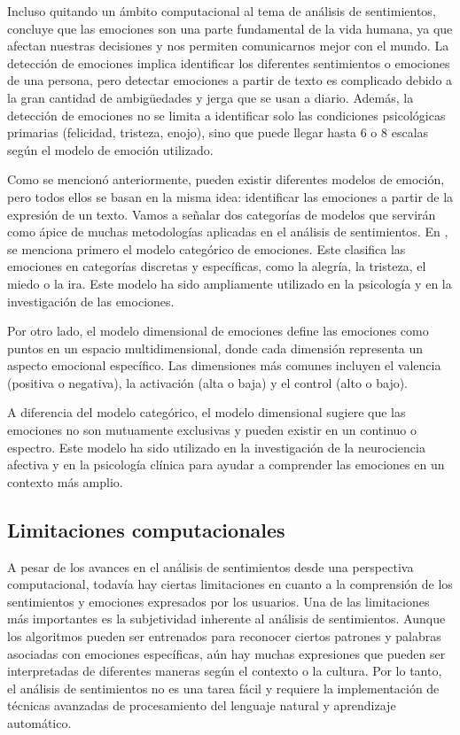 \documentclass[12pt, conference]{IEEEtran}
\begin{document}
Incluso quitando un ámbito computacional al tema de análisis de sentimientos, \cite{b2} concluye que las emociones son una parte fundamental de la vida humana, ya que afectan nuestras decisiones y nos permiten comunicarnos mejor con el mundo. 
La detección de emociones implica identificar los diferentes sentimientos o emociones de una persona, pero detectar emociones a partir de texto es complicado debido a la gran cantidad de ambigüedades y jerga que se usan a diario. 
Además, la detección de emociones no se limita a identificar solo las condiciones psicológicas primarias (felicidad, tristeza, enojo), sino que puede llegar hasta 6 o 8 escalas según el modelo de emoción utilizado.

Como se mencionó anteriormente, pueden existir diferentes modelos de emoción, pero todos ellos se basan en la misma idea: identificar las emociones a partir de la expresión de un texto. Vamos a señalar dos categorías de modelos que servirán como ápice de muchas metodologías aplicadas en el análisis de sentimientos. En \cite{b3}, se menciona primero el modelo categórico de emociones. Este clasifica las emociones en categorías discretas y específicas, como la alegría, la tristeza, el miedo o la ira. Este modelo ha sido ampliamente utilizado en la psicología y en la investigación de las emociones.

Por otro lado, el modelo dimensional de emociones define las emociones como puntos en un espacio multidimensional, donde cada dimensión representa un aspecto emocional específico. Las dimensiones más comunes incluyen el valencia (positiva o negativa), la activación (alta o baja) y el control (alto o bajo).

A diferencia del modelo categórico, el modelo dimensional sugiere que las emociones no son mutuamente exclusivas y pueden existir en un continuo o espectro. Este modelo ha sido utilizado en la investigación de la neurociencia afectiva y en la psicología clínica para ayudar a comprender las emociones en un contexto más amplio.

\subsection{Limitaciones computacionales}
A pesar de los avances en el análisis de sentimientos desde una perspectiva computacional, todavía hay ciertas limitaciones en cuanto a la comprensión de los sentimientos y emociones expresados por los usuarios. 
Una de las limitaciones más importantes es la subjetividad inherente al análisis de sentimientos. 
Aunque los algoritmos pueden ser entrenados para reconocer ciertos patrones y palabras asociadas con emociones específicas, aún hay muchas expresiones que pueden ser interpretadas de diferentes maneras según el contexto o la cultura. 
Por lo tanto, el análisis de sentimientos no es una tarea fácil y requiere la implementación de técnicas avanzadas de procesamiento del lenguaje natural y aprendizaje automático.
\end{document}
